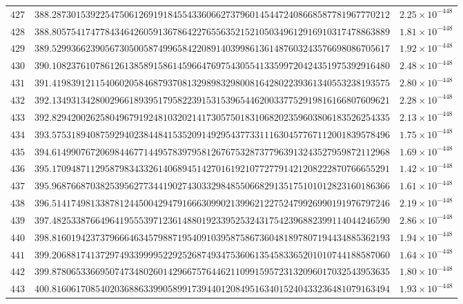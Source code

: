 \documentclass[12pt,reqno]{amsart}
\theoremstyle{remark}
\begin{document}
\begin{longtable}{clc}
$427$ & $388.2873015392254750612691918455433606627379601454472408668587781967770212$ & $2.25\times 10^{-448}$ \\
$428$ & $388.8057541747784346426059136786422765563521521050349612916910317478863889$ & $1.81\times 10^{-448}$ \\
$429$ & $389.5299366239056730500587499658422089140399861361487603243576698086705617$ & $1.92\times 10^{-448}$ \\
$430$ & $390.1082376107861261385891586145966476975430554133599720424351975392916480$ & $2.48\times 10^{-448}$ \\
$431$ & $391.4198391211540602058468793708132989832980081642802239361340553238193575$ & $2.80\times 10^{-448}$ \\
$432$ & $392.1349313428002966189395179582239153153965446200337752919816166807609621$ & $2.28\times 10^{-448}$ \\
$433$ & $392.8294200262580496791924810320214173057501831068202359603806183526254335$ & $2.13\times 10^{-448}$ \\
$434$ & $393.5753189408759294023844841535209149295437733111630457767112001839578496$ & $1.75\times 10^{-448}$ \\
$435$ & $394.6149907672069844677144957839795812676753287377963913243527959872112968$ & $1.69\times 10^{-448}$ \\
$436$ & $395.1709487112958798343326140689451427016192107727791421208222870766655291$ & $1.42\times 10^{-448}$ \\
$437$ & $395.9687668703825395627734419027430332984855066829135175101012823160186366$ & $1.61\times 10^{-448}$ \\
$438$ & $396.5141749813387812445004294791666309902139962122752479926990191976797246$ & $2.19\times 10^{-448}$ \\
$439$ & $397.4825338766496419555397123614880192339525324317542396882399114044246590$ & $2.86\times 10^{-448}$ \\
$440$ & $398.8160194237379666463457988719540910395875867360481897807194434885362193$ & $1.94\times 10^{-448}$ \\
$441$ & $399.2068817413729749339999522925268749347536061354583365201010744188587060$ & $1.64\times 10^{-448}$ \\
$442$ & $399.8780653366950747348026014296675764462110991595723132096017032543953635$ & $1.80\times 10^{-448}$ \\
$443$ & $400.8160617085402036886339905899173944012084951634015240433236481079163494$ & $1.93\times 10^{-448}$ \\

\end{longtable}
\end{document}
